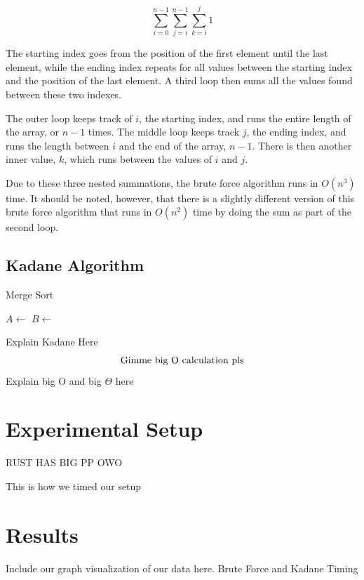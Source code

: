 \documentclass[10pt, letterpaper]{article}
\begin{document}
	\[\sum_{i = 0}^{n-1}\sum_{j = i}^{n-1}\sum_{k = i}^{j}1\]
	
	The starting index goes from the position of the first element until the last element, while the ending index repeats for all values between the starting index and the position of the last element.
	A third loop then sums all the values found between these two indexes.

	The outer loop keeps track of $i$, the starting index, and runs the entire length of the array, or $n-1$ times.
	The middle loop keeps track $j$, the ending index, and runs the length between $i$ and the end of the array, $n-1$.
	There is then another inner value, $k$, which runs between the values of $i$ and $j$. 

	Due to these three nested summations, the brute force algorithm runs in $O(n^3)$ time.
	It should be noted, however, that there is a slightly different version of this brute force algorithm that runs in $O(n^2)$ time by doing the sum as part of the second loop.
	
	\subsection{Kadane Algorithm}

  \begin{algorithm}
		\caption{Merge Sort}\label{mergesort}
	\begin{algorithmic}
	\EndIf
	\State $A\gets$
	\State $B\gets$\\
	\EndFunction
	\end{algorithmic}
	\end{algorithm}

  Explain Kadane Here
  \[
	\textnormal{Gimme big O calculation pls}
	\]
	Explain big O and big $\Theta$ here
	\section{Experimental Setup}
	RUST HAS BIG PP OWO

	This is how we timed our setup
	\section{Results}
	Include our graph visualization of our data here. Brute Force and Kadane Timing
	
\end{document}
